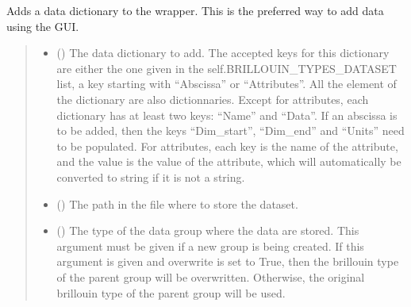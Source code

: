 \documentclass[letterpaper,10pt,english]{sphinxmanual}
\begin{document}
\begin{fulllineitems}

\begin{fulllineitems}
\label{\detokenize{source/HDF5_BLS:HDF5_BLS.wrapper.Wrapper.add_dictionary}}
\pysigstartsignatures
\pysiglinewithargsret
{}
{\sphinxparamcomma {}\sphinxparamcomma {}\sphinxparamcomma {}\sphinxparamcomma {}}
{}
\pysigstopsignatures
\sphinxAtStartPar
Adds a data dictionary to the wrapper. This is the preferred way to add data using the GUI.
\begin{quote}\begin{description}
\begin{itemize}
\item {} 
\sphinxAtStartPar
{} () \textendash{} The data dictionary to add. The accepted keys for this dictionary are either the one given in the self.BRILLOUIN\_TYPES\_DATASET list, a key starting with “Abscissa” or “Attributes”.
All the element of the dictionary are also dictionnaries.
Except for attributes, each dictionary has at least two keys: “Name” and “Data”. If an abscissa is to be added, then the keys “Dim\_start”, “Dim\_end” and “Units” need to be populated.
For attributes, each key is the name of the attribute, and the value is the value of the attribute, which will automatically be converted to string if it is not a string.

\item {} 
\sphinxAtStartPar
{} (\sphinxstyleliteralemphasis{\sphinxupquote{, }}) \textendash{} The path in the file where to store the dataset.

\item {} 
\sphinxAtStartPar
{} (\sphinxstyleliteralemphasis{\sphinxupquote{, }}) \textendash{} The type of the data group where the data are stored. This argument must be given if a new group is being created. If this argument is given and overwrite is set to True, then the brillouin type of the parent group will be overwritten. Otherwise, the original brillouin type of the parent group will be used.


\end{itemize}
\end{description}
\end{quote}
\end{fulllineitems}
\end{fulllineitems}
\end{document}
